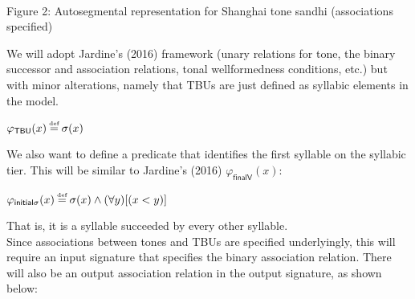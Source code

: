 \documentclass{article}
\newcommand\myeq{\mathrel{\stackrel{\makebox[0pt]{\mbox{\normalfont\tiny def}}}{=}}}
\begin{document}
\vspace{.3cm}
\begin{center}
\\
\smallskip{}
Figure 2: Autosegmental representation for Shanghai tone sandhi (associations specified)
\end{center}
\smallskip{}
We will adopt Jardine's (2016) framework (unary relations for tone, the binary successor and association relations, tonal wellformedness conditions, etc.) but with minor alterations, namely that TBUs are just defined as syllabic elements in the model.
\begin{center} 
$\varphi _{\mathsf{TBU}} (x) \myeq \sigma (x)$
\end{center} 
We also want to define a predicate that identifies the first syllable on the syllabic tier. This will be similar to Jardine's (2016) $\varphi _{\mathsf{finalV}} (x)$:
\begin{center}
$\varphi _{\mathsf{initial}\sigma}(x) \myeq \sigma (x) \wedge (\forall y) [ (x < y)]$
\end{center}
That is, it is a syllable succeeded by every other syllable.\\
\indent
Since associations between tones and TBUs are specified underlyingly, this will require an input signature that specifies the binary association relation. There will also be an output association relation in the output signature, as shown below:
\end{document}
